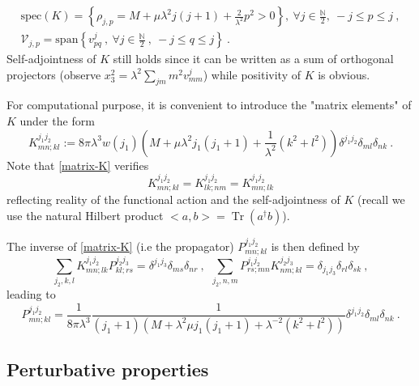 \documentclass[a4paper,11pt,twoside]{article}
\numberwithin{equation}{section}
\DeclareMathOperator{\tr}{Tr}
\theoremstyle{nonumberplain}
\newcounter{and}
\begin{document}
%
\begin{eqnarray}
&\text{spec}(K) = \left\{ \rho_{j,p} = M + \mu \lambda^2 j(j+1) + \frac{2}{\lambda^2} p^2>0 \right\},\ \forall j \in \frac{\mathbb{N}}{2} , \ -j \le p \le j \ , \label{spec-K}& \\[2pt]
&\mathcal{V}_{j,p} = \text{span}\left\{v^j_{pq} \ , \ \forall j \in \frac{\mathbb{N}}{2} \ , \ -j \le q \le j \right\} \ . \label{eigensp-K}&
\end{eqnarray}
%
Self-adjointness of $K$ still holds since it can be written as a sum of orthogonal projectors (observe $x_3^2 = \lambda^2 \sum_{jm} m^2 v^j_{mm}$) while positivity of $K$ is obvious.\par%
%
For computational purpose, it is convenient to introduce the "matrix elements" of $K$ under the form%
%
\begin{equation}
K^{j_1 j_2}_{mn;kl} := 8\pi\lambda^3 w(j_1) \left( M + \mu \lambda^2 j_1 (j_1+1) + \frac{1}{\lambda^2} (k^2+l^2) \right) \delta^{j_1j_2} \delta_{ml} \delta_{nk} \ . \label{matrix-K} 
\end{equation}
%
Note that \eqref{matrix-K} verifies%
%
\begin{equation}
K^{j_1j_2}_{mn;kl} = K^{j_1j_2}_{lk;nm} = K^{j_1j_2}_{mn;lk} \label{sym-K}
\end{equation}
%
reflecting reality of the functional action and the self-adjointness of $K$ (recall we use the natural Hilbert product $<a,b>=\tr(a^\dag b)$).\par%
%
The inverse of \eqref{matrix-K} (i.e the propagator) $P^{j_1j_2}_{mn;kl}$ is then defined by%
%
\begin{equation}
\sum_{j_2,k,l} K^{j_1j_2}_{mn;lk} P^{j_2j_3}_{kl;rs} = \delta^{j_1j_3} \delta_{ms} \delta_{nr} \ , \ \ \sum_{j_2,n,m} P^{j_1j_2}_{rs;mn} K^{j_2j_3}_{nm;kl} = \delta_{j_1j_3} \delta_{rl} \delta_{sk} \ , \label{propagator-def}
\end{equation}
%
leading to%
%
\begin{equation}
P^{j_1j_2}_{mn;kl} = \frac{1}{8\pi\lambda^3} \frac{1}{(j_1+1)\left(M+\lambda^2\mu j_1(j_1+1)+\lambda^{-2}(k^2+l^2)\right)}\delta^{j_1j_2}\delta_{ml}\delta_{nk} \ .  \label{propagator}
\end{equation}

\subsection{Perturbative properties}\label{subsection32}
\end{document}
